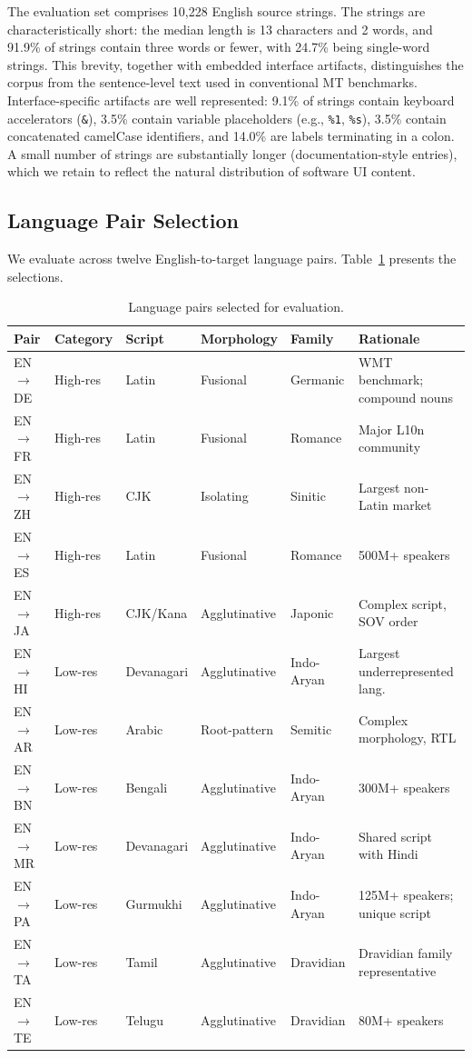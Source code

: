 \documentclass[Afour,sagev,times,doublespace]{sagej}
\begin{document}
The evaluation set comprises 10,228 English source strings. The strings are characteristically short: the median length is 13 characters and 2 words, and 91.9\% of strings contain three words or fewer, with 24.7\% being single-word strings. This brevity, together with embedded interface artifacts, distinguishes the corpus from the sentence-level text used in conventional MT benchmarks. Interface-specific artifacts are well represented: 9.1\% of strings contain keyboard accelerators (\texttt{\&}), 3.5\% contain variable placeholders (e.g., \texttt{\%1}, \texttt{\%s}), 3.5\% contain concatenated camelCase identifiers, and 14.0\% are labels terminating in a colon. A small number of strings are substantially longer (documentation-style entries), which we retain to reflect the natural distribution of software UI content.

\subsection{Language Pair Selection}

We evaluate across twelve English-to-target language pairs. Table~\ref{tab:langs} presents the selections.

\begin{table}[t]
\small\sf\centering
\caption{Language pairs selected for evaluation.\label{tab:langs}}
\begin{tabular}{@{}lllllp{4cm}@{}}
\toprule
Pair & Category & Script & Morphology & Family & Rationale \\
\midrule
EN$\to$DE & High-res & Latin & Fusional & Germanic & WMT benchmark; compound nouns \\
EN$\to$FR & High-res & Latin & Fusional & Romance & Major L10n community \\
EN$\to$ZH & High-res & CJK & Isolating & Sinitic & Largest non-Latin market \\
EN$\to$ES & High-res & Latin & Fusional & Romance & 500M+ speakers \\
EN$\to$JA & High-res & CJK/Kana & Agglutinative & Japonic & Complex script, SOV order \\
EN$\to$HI & Low-res & Devanagari & Agglutinative & Indo-Aryan & Largest underrepresented lang. \\
EN$\to$AR & Low-res & Arabic & Root-pattern & Semitic & Complex morphology, RTL \\
EN$\to$BN & Low-res & Bengali & Agglutinative & Indo-Aryan & 300M+ speakers \\
EN$\to$MR & Low-res & Devanagari & Agglutinative & Indo-Aryan & Shared script with Hindi \\
EN$\to$PA & Low-res & Gurmukhi & Agglutinative & Indo-Aryan & 125M+ speakers; unique script \\
EN$\to$TA & Low-res & Tamil & Agglutinative & Dravidian & Dravidian family representative \\
EN$\to$TE & Low-res & Telugu & Agglutinative & Dravidian & 80M+ speakers \\
\bottomrule
\end{tabular}
\end{table}
\end{document}

